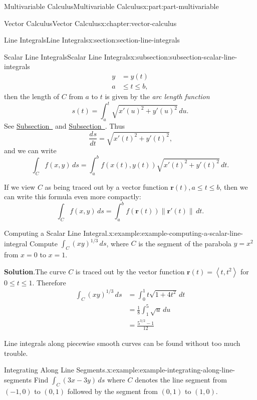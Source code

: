 \documentclass[twoside,10pt,]{book}
\newcommand{\blocktitlefont}{\relax}
\numberwithin{equation}{part}
\newcommand{\vb}[1]{\mathbf{#1}}
\newcommand{\dv}[3][]{\dfrac{d^{#1} #2}{d #3^{#1}}}
\newcommand{\norm}[1]{\left\| #1 \right\|}
\newcommand{\dotprod}[1]{\left\langle #1 \right\rangle}
\newcommand{\amp}{&}
\begin{document}
\begin{partptx}{Multivariable Calculus}{}{Multivariable Calculus}{}{}{x:part:part-multivariable}
\begin{chapterptx}{Vector Calculus}{}{Vector Calculus}{}{}{x:chapter:vector-calculus}
\begin{sectionptx}{Line Integrals}{}{Line Integrals}{}{}{x:section:section-line-integrals}
\begin{subsectionptx}{Scalar Line Integrals}{}{Scalar Line Integrals}{}{}{x:subsection:subsection-scalar-line-integrals}
\begin{align*}
y \amp = y(t) \\
a \amp \leq t\leq b \text{,}
\end{align*}
then the length of \(C\) from \(a\) to \(t\) is given by the \emph{arc length function}%
\begin{equation*}
s(t) = \int_{a}^{t}\sqrt{x'(u)^{2} + y'(u)^{2}}\,du\text{.}
\end{equation*}
See \hyperref[x:subsection:subsection-arc-length-parametric-curves]{Subsection~} and \hyperref[x:subsection:subsection-arc-length]{Subsection~}. Thus%
\begin{equation*}
\dv{s}{t} = \sqrt{x'(t)^{2} + y'(t)^{2}}\text{,}
\end{equation*}
and we can write%
\begin{equation*}
\int_{C}f(x,y)\,ds = \int_{a}^{b}f(x(t),y(t))\sqrt{x'(t)^{2} + y'(t)^{2}}\,dt\text{.}
\end{equation*}
%
\par
If we view \(C\) as being traced out by a vector function \(\vb{r}(t), a\leq t\leq b\), then we can write this formula even more compactly:%
\begin{equation*}
\int_{C}f(x,y)\,ds = \int_{a}^{b}f(\vb{r}(t))\norm{\vb{r}'(t)}\,dt\text{.}
\end{equation*}
%
\begin{example}{Computing a Scalar Line Integral.}{x:example:example-computing-a-scalar-line-integral}%
Compute \(\int_{C}(xy)^{1/3}\,ds\), where \(C\) is the segment of the parabola \(y = x^{2}\) from \(x = 0\) to \(x = 1\).%
\par\smallskip%
\noindent\textbf{\blocktitlefont Solution}.\hypertarget{g:solution:idm35150932176320}{}\quad{}The curve \(C\) is traced out by the vector function \(\vb{r}(t) = \dotprod{t,t^{2}}\) for \(0\leq t\leq 1\). Therefore%
\begin{align*}
\int_{C}(xy)^{1/3}\,ds \amp = \int_{0}^{1} t\sqrt{1 + 4t^{2}}\,dt \\
\amp = \frac{1}{8}\int_{1}^{5}\sqrt{u}\,du \\
\amp = \frac{5^{3/2} - 1}{12} 
\end{align*}
%
\end{example}
Line integrals along piecewise smooth curves can be found without too much trouble.%
\begin{example}{Integrating Along Line Segments.}{x:example:example-integrating-along-line-segments}%
Find \(\int_{C}(3x - 3y)\,ds\) where \(C\) denotes the line segment from \((-1,0)\) to \((0,1)\) followed by the segment from \((0,1)\) to \((1,0)\).%

\end{example}
\end{subsectionptx}
\end{sectionptx}
\end{chapterptx}
\end{partptx}
\end{document}
